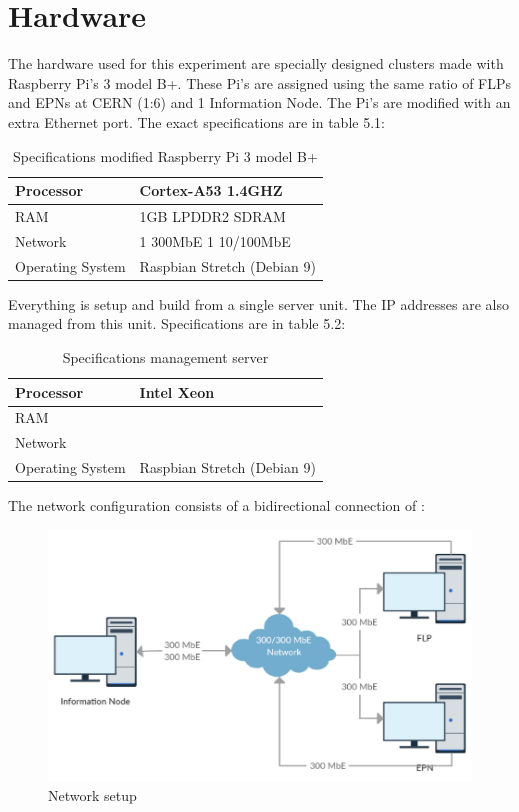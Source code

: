 \section{Hardware}
The hardware used for this experiment are specially designed clusters made with Raspberry Pi's 3 model B+. These Pi's are assigned using the same ratio of FLPs and EPNs at CERN (1:6) and 1 Information Node. The Pi's are modified with an extra Ethernet port. The exact specifications are in table 5.1:

\begin{table}[htb]
\begin{tabular}{| l | l |}
\hline
Processor & Cortex-A53 1.4GHZ\\ \hline
RAM & 1GB LPDDR2 SDRAM\\ \hline
Network & 1 300MbE 1 10/100MbE \\ \hline
Operating System & Raspbian Stretch (Debian 9)\\ \hline
\end{tabular} 
\caption{Specifications modified Raspberry Pi 3 model B+}
\end{table}

Everything is setup and build from a single server unit. The IP addresses are also managed from this unit. Specifications are in table 5.2:

\begin{table}[htb]
\begin{tabular}{| l | l |}
\hline
Processor & Intel Xeon\\ \hline
RAM & \\ \hline
Network & \\ \hline
Operating System & Raspbian Stretch (Debian 9)\\ \hline
\end{tabular}
\caption{Specifications management server}
\end{table}

\newpage

The network configuration consists of a bidirectional connection of :
\begin{figure}[htb]
    \centering
    \includegraphics[scale=0.5]{./graphics/chapter5/Network_thesis.pdf}
    \caption{Network setup}
\end{figure}

